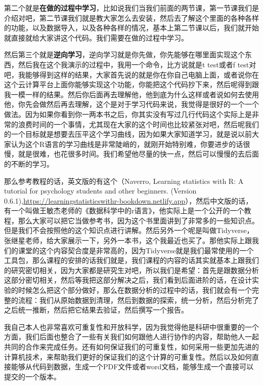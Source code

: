 \documentclass[
  oneside]{book}
\begin{document}
第二个就是\textbf{在做的过程中学习}，比如说我们当我们前面的两节课，第一节课我们是介绍对吧，第二节课我们就是教大家怎么去安装，然后去了解这个里面的各种各样的功能，以及数据导入，以及各种各样的情况，基本上第二节课以后，我们就开始就直接就给大家讲这个代码。我们需要在做的过程中学习。

然后第三个就是\textbf{逆向学习}，逆向学习就是你先做，你先能够在哪里面实现这个东西，然后我在这个我演示的过程中，我用一个命令，比方说就是t
test或者f
test对吧，我能够得到这样的结果，大家首先说的就是你在你自己电脑上面，或者说你在这个云计算平台上面你能够实现这个功能，你能把这个代码抄下来，然后呢得到跟我一模一样的结果。然后你后面再去理解他，他到底为什么这样或者说如何去使用他，你先会做然后再去理解，这个是对于学习代码来说，我觉得是很好的一个一个做法。因为如果你看到你一两本书之后，你其实没有写过几行代码这个实际上是非常的浪费时间的一个事情，尤其现在大家的这个时间也比较紧张对吧，然后呢我们的一个目标就是想要去压平这个学习曲线，因为如果大家知道学习，就是说以前大家认为这个R语言的学习曲线是非常陡峭的，就刚开始特别难，你要进步的话很慢，就是很难，也花很多时间。我们希望他尽量的快一点，然后可以慢慢的去后面的不断的学习。

那么参考教程的话，英文版的有这个（Naverro, Learning statistics with R: A
tutorial for psychology students and other beginners. (Version
0.6.1),\url{https://learningstatisticswithr-bookdown.netlify.app}），然后中文版的话，有一个叫做王敏杰老师的《数据科学中的r语言》，他实际上是一个公开的一个教程，那么大家可以把它当做参考书，因为这个书里面讲到了非常多的一些知识点。但是我们不会按照他的这个知识点进行讲解。然后另外一个呢是叫做Tidyverse，张继星老师，给大家展示一下，另外一本书，这个我最近也买了。那他实际上跟我们的课堂的这个内容契合度是非常高的，因为Tidyverse就是我们最常使用的一个工具包，那么课程的安排的话我们就是，我们课程的内容的话其实就基本上跟我们的研究密切相关，因为大家都是研究生对吧，所以我们是希望：首先是跟数据分析这部分密切相关，然后等我把这部分解决之后，我们看到后面进阶的话，在设计实验的时候怎么把这个部分做好，那么在数据分析的过程中的话，我们就会有一个完整的流程：我们从原始数据到清理，然后到数据的探索，统一分析，然后分析完了之后统一推断，然后把它结果去验证，然后撰写一个报告。

我自己本人也非常喜欢可重复性和开放科学，因为我觉得他是科研中很重要的一个方面，我们后面也整合了一些有关我们如何跟他人进行协作的内容，帮助他人一起共同的合作来完成任务。还有如何保证我们的可重复性，如何采用一些更加先进的计算机技术，来帮助我们更好的保证我们的这个计算的可重复性。然后以及如何直接能够从代码到数据，生成一个PDF文件或者word文档，能够生成一个直接可以提交的一个版本。
\end{document}
